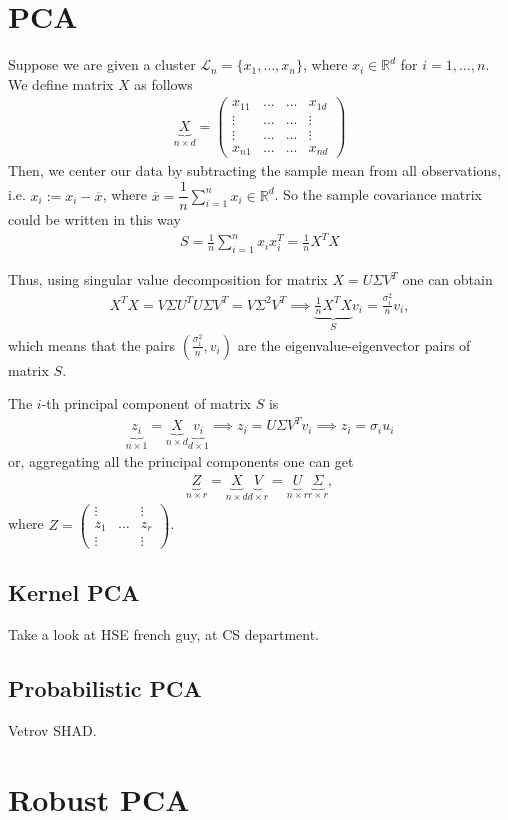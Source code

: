 \documentclass{article}
\begin{document}
\section{PCA}
Suppose we are given a cluster $\mathcal{L}_n = \{ x_1, \dots, x_n \}$, where $x_i \in \mathbb{R}^d$ for $i = 1, \dots, n$. We define matrix $X$ as follows 
\begin{align}
\underbrace{X}_{n \times d} = \begin{pmatrix} x_{11} & \dots & \dots & x_{1d} \\ \vdots  & \dots & \dots & \vdots \\ \vdots  & \dots & \dots & \vdots \\ x_{n1} & \dots & \dots & x_{nd} \end{pmatrix}
\end{align}
Then, we center our data by subtracting the sample mean from all observations, i.e. $x_i := x_i - \overline{x}$, where $\overline{x} = \dfrac 1 n \sum_{i=1}^n x_i \in \mathbb{R}^d$. So the sample covariance matrix could be written in this way
\begin{align}
S = \frac 1 n \sum_{i=1}^n x_i x_i^T = \frac 1 n X^T X
\end{align}
\par Thus, using singular value decomposition for matrix $X = U \Sigma V^T$ one can obtain
\begin{eqnarray}
X^TX = V\Sigma U^T U \Sigma V^T = V \Sigma^2 V^T \implies \underbrace{\frac 1 n X^TX}_{S} v_i = \frac{\sigma_i^2} n v_i,
\end{eqnarray}
which means that the pairs $\left(\frac {\sigma_i^2} {n}, v_i \right)$ are the eigenvalue-eigenvector pairs of matrix $S$. 
\par The $i$-th principal component of matrix $S$ is 
\begin{align}
\underbrace{z_i}_{n \times 1} = \underbrace{X}_{n \times d} \underbrace{v_i}_{d \times 1} \implies z_i = U \Sigma V^T v_i \implies z_i = \sigma_i u_i 
\end{align}
or, aggregating all the principal components one can get
\begin{align}
\underbrace{Z}_{n \times r} = \underbrace{X}_{n \times d} \underbrace{V}_{d \times r} = \underbrace{U}_{n \times r} \underbrace{\Sigma}_{r \times r},
\end{align}
where $Z = \begin{pmatrix} \vdots &  & \vdots \\ z_1 & \dots & z_r \\ \vdots &  & \vdots \end{pmatrix}
$.
\subsection{Kernel PCA}
Take a look at HSE french guy, at CS department. 
\subsection{Probabilistic PCA}
Vetrov SHAD.
\section{Robust PCA}
\end{document}
